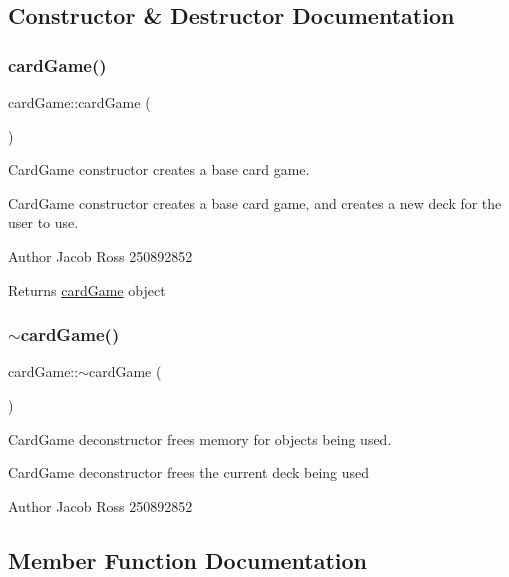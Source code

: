\subsection{Constructor \& Destructor Documentation}
\mbox{\label{classcardGame_a9f128c2ea5d426a79b506ed02771bdbc}} 
\subsubsection{\texorpdfstring{card\+Game()}{cardGame()}}
{\footnotesize\ttfamily card\+Game\+::card\+Game (\begin{DoxyParamCaption}{ }\end{DoxyParamCaption})}



Card\+Game constructor creates a base card game. 

Card\+Game constructor creates a base card game, and creates a new deck for the user to use. \begin{DoxyAuthor}{Author}
Jacob Ross 250892852 
\end{DoxyAuthor}
\begin{DoxyReturn}{Returns}
\hyperlink{classcardGame}{card\+Game} object 
\end{DoxyReturn}
\mbox{\label{classcardGame_a23e7135b422d487d761b475713cf2e7a}} 
\subsubsection{\texorpdfstring{$\sim$card\+Game()}{~cardGame()}}
{\footnotesize\ttfamily card\+Game\+::$\sim$card\+Game (\begin{DoxyParamCaption}{ }\end{DoxyParamCaption})}



Card\+Game deconstructor frees memory for objects being used. 

Card\+Game deconstructor frees the current deck being used \begin{DoxyAuthor}{Author}
Jacob Ross 250892852 
\end{DoxyAuthor}


\subsection{Member Function Documentation}
\mbox{\label{classcardGame_ae8e04249f37f61e3adfa03cfbad3b021}} 
